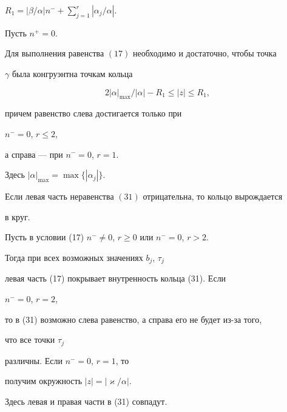 $R_1=|\beta/\alpha|n^{-} + \sum\limits_{j=1}^{r}|\alpha_{j}/\alpha|$.





\begin{thm}


Пусть $n^{+} =0$.


Для выполнения равенства $(17)$ необходимо и достаточно, чтобы точка


$\gamma$ была конгруэнтна точкам кольца


\begin{equation}


2|\alpha|_{\max}/|\alpha| - R_1\le|z|\le R_1,


\end{equation}


причем равенство слева достигается только при


$n^{-}=0$, $r\le2$,


а справа --- при $n^{-}=0$, $r=1$.


Здесь $|\alpha|_{\max}=\max \{|\alpha_j |\}$.


Если левая часть неравенства $(31)$ отрицательна, то кольцо вырождается


в круг.


\end{thm}





\begin{pf}


Пусть в условии (17) $n^- \ne 0$, $r\ge 0$ или $n^- = 0$, $r>2$.


Тогда при всех возможных значениях $b_{j}$, $\tau_{j}$


левая часть (17) покрывает внутренность кольца (31). Если


$n^- = 0$, $r=2$,


то в (31) возможно слева равенство, а справа его не будет из-за того,


что все точки $\tau_ j$


различны. Если $n^{-} =0$, $r=1$, то


получим окружность $|z|=|\varkappa/\alpha|$.


Здесь левая и правая части в (31) совпадут.


\end{pf}





